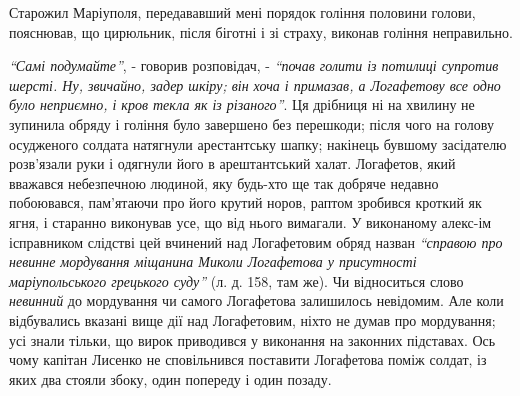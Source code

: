 \documentclass[a4paper,20pt]{report}
\begin{document}

Старожил Маріуполя, передававший мені порядок гоління половини голови, пояснював,
що цирюльник, після біготні і зі страху, виконав гоління неправильно.

\emph{``Самі подумайте''}, - говорив розповідач, - \emph{``почав голити із потилиці супротив
шерсті. Ну, звичайно, задер шкіру; він хоча і примазав, а Логафетову все одно було неприємно, і кров
текла як із різаного''}. Ця дрібниця ні на хвилину не зупинила обряду і гоління було завершено
без перешкоди; після чого на голову осудженого солдата натягнули арестантську шапку; накінець
бувшому засідателю розв'язали руки і одягнули його в арештантський халат. Логафетов,
який вважався небезпечною людиной, яку будь-хто ще так добряче недавно побоювався, пам'ятаючи про
його крутий норов, раптом зробився кроткий як ягня, і старанно виконував усе, що від нього вимагали.
У виконаному алекс-ім ісправником слідстві цей вчинений над Логафетовим обряд назван \emph{``справою про невинне 
мордування міщанина Миколи Логафетова у присутності маріупольського грецького суду''} (л. д. 158, там же). Чи відноситься
слово \emph{невинний} до мордування чи самого Логафетова залишилось невідомим. Але коли відбувались вказані вище дії
над Логафетовим, ніхто не думав про мордування; усі знали тільки, що вирок приводився у виконання на законних підставах.
Ось чому капітан Лисенко не сповільнився поставити Логафетова поміж солдат, із яких два стояли
збоку, один попереду і один позаду.
\end{document}
